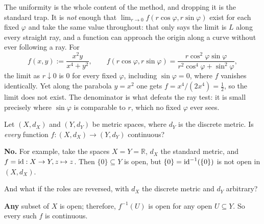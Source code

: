 \begin{ainote}
\label{note:polar_limits_need_uniformity}
The uniformity is the whole content of the method, and dropping it is the standard trap. It is
\emph{not} enough that $\lim_{r\to0}f(r\cos\varphi,r\sin\varphi)$ exist for each fixed $\varphi$
and take the same value throughout: that only says the limit is $L$ along every straight ray,
and a function can approach the origin along a curve without ever following a ray. For
\[f(x,y) := \frac{x^2y}{x^4+y^2}, \qquad
  f(r\cos\varphi,r\sin\varphi) = \frac{r\cos^2\varphi\sin\varphi}{r^2\cos^4\varphi+\sin^2\varphi},\]
the limit as $r \downarrow 0$ is $0$ for every fixed $\varphi$, including $\sin\varphi = 0$,
where $f$ vanishes identically. Yet along the parabola $y = x^2$ one gets
$f = x^4/(2x^4) = \tfrac12$, so the limit does not exist. The denominator is what defeats the
ray test: it is small precisely where $\sin\varphi$ is comparable to $r$, which no fixed
$\varphi$ ever sees.
\end{ainote}

\begin{question}
Let $(X, d_X)$ and $(Y, d_Y)$ be metric spaces, where $d_Y$ is the discrete metric. Is
\emph{every} function $f : (X,d_X) \to (Y,d_Y)$ continuous?
\end{question}

\begin{answer}
\textbf{No.} For example, take the spaces $X = Y = \mathbb{R}$, $d_X$ the standard metric, and
$f = \operatorname{id} : X \to Y, z \mapsto z$. Then $\{0\} \subseteq Y$ is open, but
$\{0\} = \operatorname{id}^{-1}(\{0\})$ is not open in $(X, d_X)$.
\end{answer}

\begin{question}
And what if the roles are reversed, with $d_X$ the discrete metric and $d_Y$ arbitrary?
\end{question}

\begin{answer}
\textbf{Any} subset of $X$ is open; therefore, $f^{-1}(U)$ is open for any open $U \subseteq Y$. So
every such $f$ is continuous.
\end{answer}





